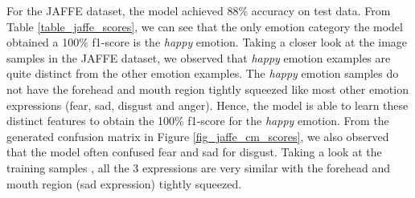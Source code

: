 \documentclass[master]{thesis-uestc}
\begin{document}
For the JAFFE dataset, the model achieved 88\% accuracy on test data. From Table \ref{table_jaffe_scores}, we can see that the only emotion category the model obtained a 100\% f1-score is the \textit{happy} emotion. Taking a closer look at the image samples in the JAFFE dataset, we observed that \textit{happy} emotion examples are quite distinct from the other emotion examples. The \textit{happy} emotion samples do not have the forehead and mouth region tightly squeezed like most other emotion expressions (fear, sad, disgust and anger). Hence, the model is able to learn these distinct features to obtain the 100\% f1-score for the \textit{happy} emotion. From the generated confusion matrix in Figure \ref{fig_jaffe_cm_scores}, we also observed that the model often confused fear and sad for disgust. Taking a look at the training samples , all the 3 expressions are very similar with the forehead and mouth region (sad expression) tightly squeezed. 



\end{document}
